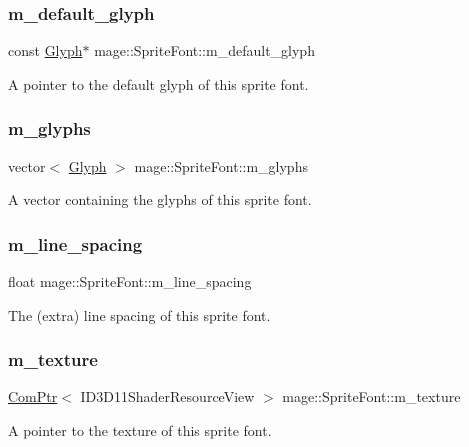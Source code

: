 \subsubsection{\texorpdfstring{m\+\_\+default\+\_\+glyph}{m\_default\_glyph}}
{\footnotesize\ttfamily const \hyperlink{structmage_1_1_glyph}{Glyph}$\ast$ mage\+::\+Sprite\+Font\+::m\+\_\+default\+\_\+glyph\hspace{0.3cm}{\ttfamily [private]}}

A pointer to the default glyph of this sprite font. \hypertarget{classmage_1_1_sprite_font_acf4efc927a2ca3fc0eb297ed080ddfbb}{}\label{classmage_1_1_sprite_font_acf4efc927a2ca3fc0eb297ed080ddfbb} 
\subsubsection{\texorpdfstring{m\+\_\+glyphs}{m\_glyphs}}
{\footnotesize\ttfamily vector$<$ \hyperlink{structmage_1_1_glyph}{Glyph} $>$ mage\+::\+Sprite\+Font\+::m\+\_\+glyphs\hspace{0.3cm}{\ttfamily [private]}}

A vector containing the glyphs of this sprite font. \hypertarget{classmage_1_1_sprite_font_a2b6de0c210a7cf5c72dd1bb69bff7a3b}{}\label{classmage_1_1_sprite_font_a2b6de0c210a7cf5c72dd1bb69bff7a3b} 
\subsubsection{\texorpdfstring{m\+\_\+line\+\_\+spacing}{m\_line\_spacing}}
{\footnotesize\ttfamily float mage\+::\+Sprite\+Font\+::m\+\_\+line\+\_\+spacing\hspace{0.3cm}{\ttfamily [private]}}

The (extra) line spacing of this sprite font. \hypertarget{classmage_1_1_sprite_font_ad3740a71e8dfeb70e167c33fec855720}{}\label{classmage_1_1_sprite_font_ad3740a71e8dfeb70e167c33fec855720} 
\subsubsection{\texorpdfstring{m\+\_\+texture}{m\_texture}}
{\footnotesize\ttfamily \hyperlink{namespacemage_ae74f374780900893caa5555d1031fd79}{Com\+Ptr}$<$ I\+D3\+D11\+Shader\+Resource\+View $>$ mage\+::\+Sprite\+Font\+::m\+\_\+texture\hspace{0.3cm}{\ttfamily [private]}}

A pointer to the texture of this sprite font. 